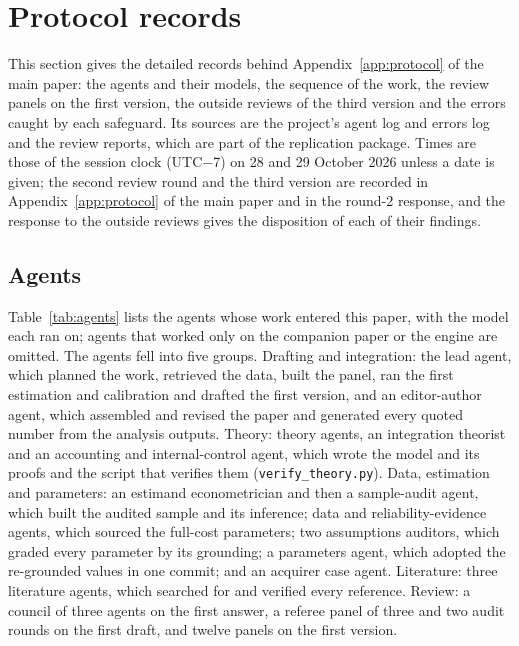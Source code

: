 \section{Protocol records}\label{supp:protocol}
This section gives the detailed records behind Appendix~\ref{app:protocol} of the main paper: the agents and their models, the sequence of the work, the review panels on the first version, the outside reviews of the third version and the errors caught by each safeguard. Its sources are the project's agent log and errors log and the review reports, which are part of the replication package. Times are those of the session clock (UTC$-$7) on 28 and 29 October 2026 unless a date is given; the second review round and the third version are recorded in Appendix~\ref{app:protocol} of the main paper and in the round-2 response, and the response to the outside reviews gives the disposition of each of their findings.

\subsection{Agents}
Table~\ref{tab:agents} lists the agents whose work entered this paper, with the model each ran on; agents that worked only on the companion paper or the engine are omitted. The agents fell into five groups. Drafting and integration: the lead agent, which planned the work, retrieved the data, built the panel, ran the first estimation and calibration and drafted the first version, and an editor-author agent, which assembled and revised the paper and generated every quoted number from the analysis outputs. Theory: theory agents, an integration theorist and an accounting and internal-control agent, which wrote the model and its proofs and the script that verifies them (\texttt{verify\_theory.py}). Data, estimation and parameters: an estimand econometrician and then a sample-audit agent, which built the audited sample and its inference; data and reliability-evidence agents, which sourced the full-cost parameters; two assumptions auditors, which graded every parameter by its grounding; a parameters agent, which adopted the re-grounded values in one commit; and an acquirer case agent. Literature: three literature agents, which searched for and verified every reference. Review: a council of three agents on the first answer, a referee panel of three and two audit rounds on the first draft, and twelve panels on the first version.

